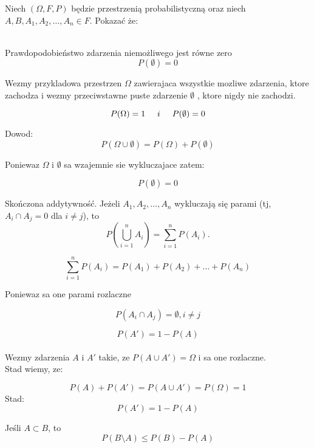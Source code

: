 \medskip
{} 
\medskip

Niech $(\Omega, F ,P)$ będzie przestrzenią probabilistyczną oraz niech \\ $A,B, A_1,A_2, \ldots, A_n \in F$. Pokazać że:\\ \\

\medskip
{} 
\medskip

Prawdopodobieństwo zdarzenia niemożliwego jest równe zero
$$
P(\emptyset) = 0
$$

Wezmy przykladowa przestrzen $\Omega$ zawierajaca wszystkie mozliwe zdarzenia, ktore zachodza i wezmy przeciwstawne puste zdarzenie $\emptyset$ , ktore nigdy nie zachodzi.


$$ P(\Omega) = 1 \hspace{0.5cm} i \hspace{0.5cm}  P(\emptyset) = 0 $$

Dowod: \\

$$P(\Omega \cup \emptyset) = P(\Omega) + P(\emptyset)$$

Poniewaz $\Omega$ i $\emptyset$ sa wzajemnie sie wykluczajace zatem: 

$$ P(\emptyset) = 0 $$

\medskip
{} 
\medskip


Skończona addytywność. Jeżeli $A_1,A_2, \ldots, A_n$ wykluczają się parami (tj, $A_i \cap A_j = 0$ dla $i \neq j$), to
$$
P\left(\bigcup_{i=1}^{n} A_i \right) = \sum_{i=1}^{n} P(A_i).
$$

$$\sum_{i=1}^{n} P(A_i) = P(A_1) + P(A_2) + \ldots + P(A_n)$$

Poniewaz sa one parami rozlaczne 

$$ P(A_i \cap A_j) = \emptyset , i \neq j$$

\medskip
{} 
\medskip

$$
P(A') = 1 - P(A)
$$\\

Wezmy zdarzenia $A$ i $A'$ takie, ze $P(A \cup A') = \Omega$ i sa one rozlaczne.\\

Stad wiemy, ze:

$$P(A) + P(A') = P(A \cup A') = P(\Omega) = 1$$
Stad:
$$P(A') = 1 - P(A)$$


\medskip
{} 
\medskip

Jeśli $A \subset B$, to 
$$
P(B \setminus A) \leq P(B) - P(A)
$$\\\\


